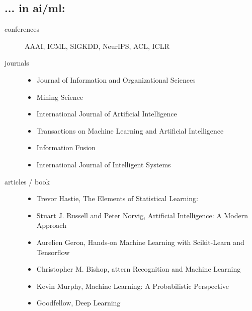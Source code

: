\documentclass{article}
\begin{document}
\subsection*{... in ai/ml:}
\begin{description}
    \item[conferences] AAAI, ICML, SIGKDD, NeurIPS, ACL, ICLR
    \item[journals]  \hfill
    \begin{itemize}
        \item Journal of Information and Organizational Sciences
        \item Mining Science
        \item International Journal of Artificial Intelligence
        \item Transactions on Machine Learning and Artificial Intelligence
        \item Information Fusion
        \item International Journal of Intelligent Systems
    \end{itemize}
    \item[articles / book] \hfill
    \begin{itemize}
        \item Trevor Hastie, The Elements of Statistical Learning: 
        \item Stuart J. Russell and Peter Norvig, Artificial Intelligence: A Modern Approach
        \item Aurelien Geron, Hands-on Machine Learning with Scikit-Learn and Tensorflow
        \item Christopher M. Bishop, attern Recognition and Machine Learning 
        \item Kevin Murphy, Machine Learning: A Probabilistic Perspective
        \item Goodfellow, Deep Learning
    \end{itemize}  


\end{description}
\end{document}

